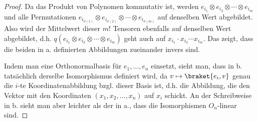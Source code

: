 \begin{proof}
Da das Produkt von Polynomen kommutativ ist, werden $e_{i_1} \otimes e_{i_2} \otimes \cdots \otimes e_{i_m}$ und alle Permutationen $e_{i_{\sigma(1)}} \otimes e_{i_{\sigma(2)}} \otimes \cdots \otimes e_{i_{\sigma(m)}}$ auf denselben Wert abgebildet. Also wird der Mittelwert dieser $m!$ Tensoren ebenfalls auf denselben Wert abgebildet, d.h. $q(e_{i_1} \otimes e_{i_2} \otimes \cdots \otimes e_{i_m})$ geht auch auf $x_{i_1}\cdot x_{i_2} \cdots x_{i_m}$. Das zeigt, dass die beiden in a. definierten Abbildungen zueinander invers sind.

Indem man eine Orthonormalbasis für $e_1, \ldots, e_n$ einsetzt, sieht man, dass in b. tatsächlich derselbe Isomorphismus definiert wird, da $v\mapsto \braket{e_i, v}$ genau die $i$-te Koordinatenabbildung bzgl. dieser Basis ist, d.h. die Abbildung, die den Vektor mit den Koordinaten $(x_1, x_2, \ldots, x_n)$ auf $x_i$ schickt. An der Schreibweise in b. sieht man aber leichter als der in a., dass die Isomorphismen $O_n$-linear sind. 
\end{proof}
